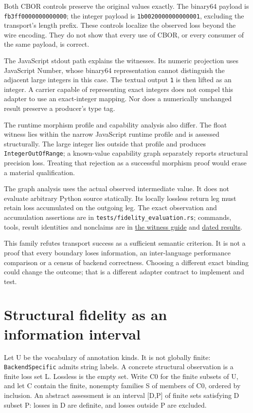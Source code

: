 \documentclass[11pt]{article}
\begin{document}
Both CBOR controls preserve the original values exactly. The binary64 payload is \texttt{fb3ff0000000000000}; the integer payload is \texttt{1b0020000000000001}, excluding the transport's length prefix. These controls localize the observed loss beyond the wire encoding. They do not show that every use of CBOR, or every consumer of the same payload, is correct.

The JavaScript stdout path explains the witnesses. Its numeric projection uses JavaScript Number, whose binary64 representation cannot distinguish the adjacent large integers in this case. The textual output \texttt{1} is then lifted as an integer. A carrier capable of representing exact integers does not compel this adapter to use an exact-integer mapping. Nor does a numerically unchanged result preserve a producer's type tag.

The runtime morphism profile and capability analysis also differ. The float witness lies within the narrow JavaScript runtime profile and is assessed structurally. The large integer lies outside that profile and produces \texttt{IntegerOutOfRange}; a known-value capability graph separately reports structural precision loss. Treating that rejection as a successful morphism proof would erase a material qualification.

The graph analysis uses the actual observed intermediate value. It does not evaluate arbitrary Python source statically. Its locally lossless return leg must retain loss accumulated on the outgoing leg. The exact observation and accumulation assertions are in \texttt{tests/fidelity\_evaluation.rs}; commands, tools, result identities and nonclaims are in \href{../../benchmarks/fidelity/README.md}{the witness guide} and \href{../../benchmarks/fidelity/RESULTS.md}{dated results}.

This family refutes transport success as a sufficient semantic criterion. It is not a proof that every boundary loses information, an inter-language performance comparison or a census of backend correctness. Choosing a different exact binding could change the outcome; that is a different adapter contract to implement and test.

\clearpage

\section{Structural fidelity as an information interval}

Let U be the vocabulary of annotation kinds. It is not globally finite: \texttt{BackendSpecific} admits string labels. A concrete structural observation is a finite loss set L. Lossless is the empty set. Write C0 for the finite subsets of U, and let C contain the finite, nonempty families S of members of C0, ordered by inclusion. An abstract assessment is an interval [D,P] of finite sets satisfying D subset P: losses in D are definite, and losses outside P are excluded.
\end{document}
